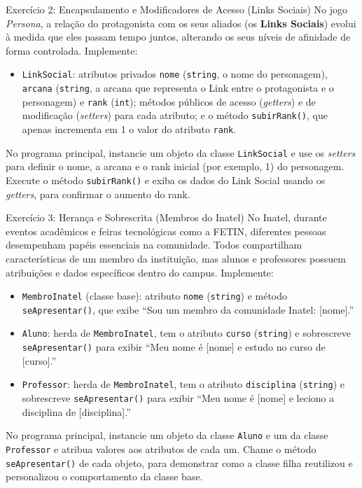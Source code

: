 \begin{exercicioCpp}{Exercício 2: Encapsulamento e Modificadores de Acesso (Links Sociais)}
No jogo \textit{Persona}, a relação do protagonista com os seus aliados (os \textbf{Links
Sociais}) evolui à medida que eles passam tempo juntos, alterando os seus níveis de afinidade
de forma controlada. Implemente:

\begin{itemize}
    \item \texttt{LinkSocial}: atributos privados \texttt{nome} (\texttt{string}, o nome do
    personagem), \texttt{arcana} (\texttt{string}, a arcana que representa o Link entre o
    protagonista e o personagem) e \texttt{rank} (\texttt{int}); métodos públicos de acesso
    (\textit{getters}) e de modificação (\textit{setters}) para cada atributo; e o método
    \texttt{subirRank()}, que apenas incrementa em 1 o valor do atributo \texttt{rank}.
\end{itemize}

No programa principal, instancie um objeto da classe \texttt{LinkSocial} e use os
\textit{setters} para definir o nome, a arcana e o rank inicial (por exemplo, 1) do personagem.
Execute o método \texttt{subirRank()} e exiba os dados do Link Social usando os
\textit{getters}, para confirmar o aumento do rank.
\end{exercicioCpp}

\begin{exercicioCpp}{Exercício 3: Herança e Sobrescrita (Membros do Inatel)}
No Inatel, durante eventos acadêmicos e feiras tecnológicas como a FETIN, diferentes pessoas
desempenham papéis essenciais na comunidade. Todos compartilham características de um membro
da instituição, mas alunos e professores possuem atribuições e dados específicos dentro do
campus. Implemente:

\begin{itemize}
    \item \texttt{MembroInatel} (classe base): atributo \texttt{nome} (\texttt{string}) e método
    \texttt{seApresentar()}, que exibe ``Sou um membro da comunidade Inatel: [nome].''

    \item \texttt{Aluno}: herda de \texttt{MembroInatel}, tem o atributo \texttt{curso}
    (\texttt{string}) e sobrescreve \texttt{seApresentar()} para exibir ``Meu nome é [nome] e
    estudo no curso de [curso].''

    \item \texttt{Professor}: herda de \texttt{MembroInatel}, tem o atributo
    \texttt{disciplina} (\texttt{string}) e sobrescreve \texttt{seApresentar()} para exibir
    ``Meu nome é [nome] e leciono a disciplina de [disciplina].''
\end{itemize}

No programa principal, instancie um objeto da classe \texttt{Aluno} e um da classe
\texttt{Professor} e atribua valores aos atributos de cada um. Chame o método
\texttt{seApresentar()} de cada objeto, para demonstrar como a classe filha reutilizou e
personalizou o comportamento da classe base.
\end{exercicioCpp}

